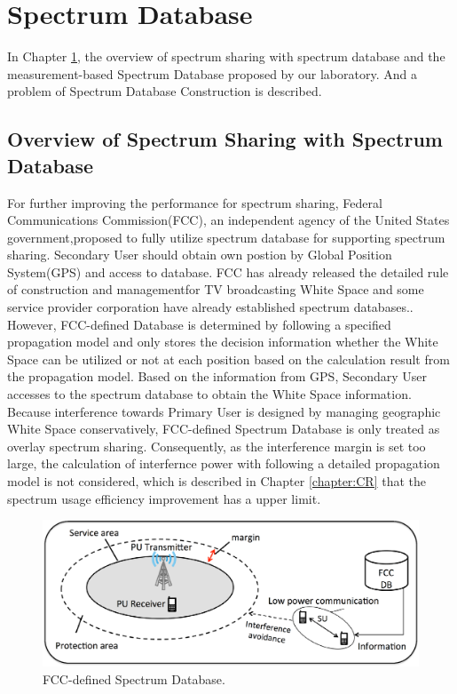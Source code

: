 \chapter[Spectrum Database]{Spectrum Database}
\label{chapter:Database}
In Chapter \ref{chapter:Database}, the overview of spectrum sharing with spectrum database and the measurement-based Spectrum Database proposed by our laboratory. And a problem of Spectrum Database Construction is described.

\section{Overview of Spectrum Sharing with Spectrum Database}
For further improving the performance for spectrum sharing, Federal Communications Commission(FCC), an independent agency of the United States government,proposed to fully utilize spectrum database for supporting spectrum sharing. Secondary User should obtain own postion by Global Position System(GPS) and access to database. FCC has already released the detailed rule of construction and managementfor TV broadcasting White Space and some service provider corporation have already established spectrum databases.\cite{ref:fcc,ref:google,ref:microsoft}. However, FCC-defined Database is determined by following a specified propagation model and only stores the decision information whether the White Space can be utilized or not at each position based on the calculation result from the propagation model. Based on the information from GPS, Secondary User accesses to the spectrum database to obtain the White Space information. Because interference towards Primary User is designed by managing geographic White Space conservatively, FCC-defined Spectrum Database is only treated as overlay spectrum sharing. Consequently, as the interference margin is set too large, the calculation of interfernce power with following a detailed propagation model is not considered, which is described in Chapter \ref{chapter:CR} that the spectrum usage efficiency improvement has a upper limit.
\begin{figure}[!htp]
\begin{center}
\includegraphics[width=150mm,clip]{fcc_sdb.eps}
\caption{FCC-defined Spectrum Database.}
\label{fig:fcc-defined_sdb}
\end{center}
\end{figure}

